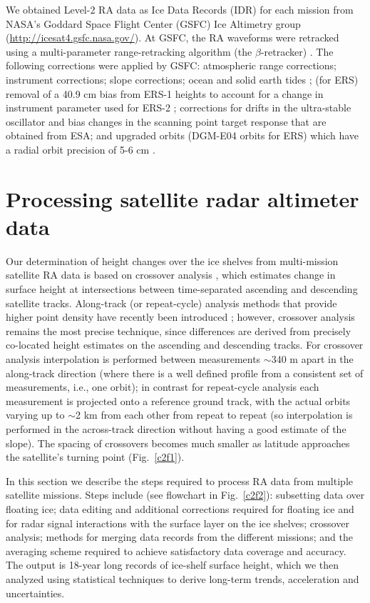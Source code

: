 We obtained Level-2 RA data as Ice Data Records (IDR) for each mission from NASA's Goddard Space Flight Center (GSFC) Ice Altimetry group (\url{http://icesat4.gsfc.nasa.gov/}). At GSFC, the RA waveforms were retracked using a multi-parameter range-retracking algorithm (the $\beta$-retracker) \parencite{Zwally2001}. The following corrections were applied by GSFC: atmospheric range corrections; instrument corrections; slope corrections; ocean and solid earth tides \parencite{Brenner1983, Zwally2001, Zwally2005}; (for ERS) removal of a 40.9 cm bias from ERS-1 heights to account for a change in instrument parameter used for ERS-2 \parencite{Femenias1996}; corrections for drifts in the ultra-stable oscillator and bias changes in the scanning point target response that are obtained from ESA; and upgraded orbits (DGM-E04 orbits for ERS) which have a radial orbit precision of 5-6 cm \parencite{Scharroo1998}.


\section{Processing satellite radar altimeter data}

Our determination of height changes over the ice shelves from multi-mission satellite RA data is based on crossover analysis \parencite[e.g.,][]{Davis2004, Wingham2009, Zwally2005}, which estimates change in surface height at intersections between time-separated ascending and descending satellite tracks. Along-track (or repeat-cycle) analysis methods that provide higher point density have recently been introduced \parencite{Flament2012, Moholdt2010, Pritchard2012}; however, crossover analysis remains the most precise technique, since differences are derived from precisely co-located height estimates on the ascending and descending tracks. For crossover analysis interpolation is performed between measurements $\sim$340 m apart in the along-track direction (where there is a well defined profile from a consistent set of measurements, i.e., one orbit); in contrast for repeat-cycle analysis each measurement is projected onto a reference ground track, with the actual orbits varying up to $\sim$2 km from each other from repeat to repeat (so interpolation is performed in the across-track direction without having a good estimate of the slope). The spacing of crossovers becomes much smaller as latitude approaches the satellite's turning point (Fig.~\ref{c2f1}).

In this section we describe the steps required to process RA data from multiple satellite missions. Steps include (see flowchart in Fig.~\ref{c2f2}): subsetting data over floating ice; data editing and additional corrections required for floating ice and for radar signal interactions with the surface layer on the ice shelves; crossover analysis; methods for merging data records from the different missions; and the averaging scheme required to achieve satisfactory data coverage and accuracy. The output is 18-year long records of ice-shelf surface height, which we then analyzed using statistical techniques to derive long-term trends, acceleration and uncertainties.


